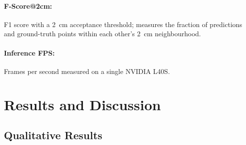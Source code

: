\documentclass{article}
\begin{document}
\paragraph{F-Score@2cm:}
F1 score with a 2~cm acceptance threshold; measures the fraction of predictions and ground-truth points within each other's 2~cm neighbourhood.

\paragraph{Inference FPS:}
Frames per second measured on a single NVIDIA L40S.


\section{Results and Discussion}
\label{sec:results}

\subsection{Qualitative Results}
\end{document}
